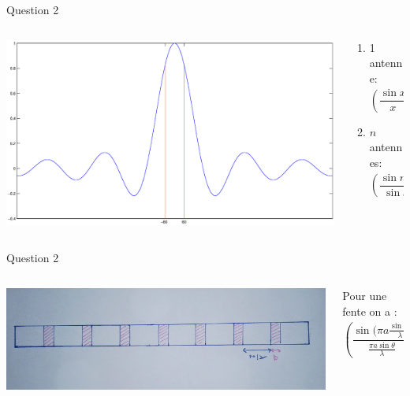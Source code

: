\documentclass{beamer}
\begin{document}
\begin{frame}{Question 2}
	\begin{columns}
		\begin{column}{0.60\textwidth}
			\begin{center}
	    		\includegraphics[scale=0.21]{sinxx.eps}
        		\end{center}
        	\end{column}
        	\begin{column}{0.35\textwidth}
			\begin{center}
	    \begin{enumerate}
	    \item 1 antenne:$$ \left( \frac{\sin x}{x}\right)^2$$
	    \item $n$ antennes: $$ \left( \frac{\sin nx}{\sin x}\right)^2 \cdot \left( \frac{\sin x}{x}\right)$$
	    \end{enumerate}
	    
        	\end{center}
        	\end{column}
        	\end{columns}
\end{frame}
\begin{frame}{Question 2}
	\begin{columns}
		\begin{column}{0.40\textwidth}
			\begin{center}
	    		\includegraphics[scale=0.25, angle=90]{Question2.png}
        		\end{center}
        	\end{column}
        	\begin{column}{0.40\textwidth}
			\begin{center}
	    Pour une fente on a :
	    $$\left( \frac{\sin (\pi a \frac{\sin \theta)}{\lambda}}{\frac{\pi a \sin \theta}{\lambda}}\right)^2=\frac{1}{2}$$
	    
        	\end{center}
        	\end{column}
        	\end{columns}
\end{frame}
\end{document}
